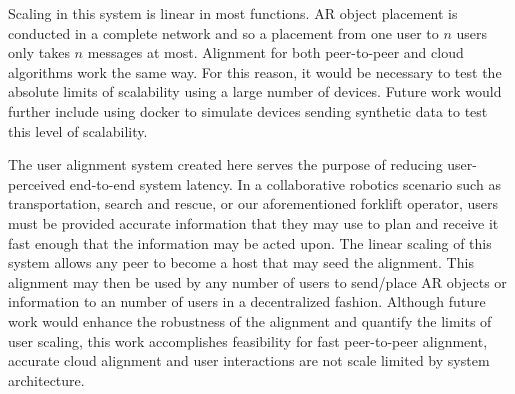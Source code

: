 \documentclass{vgtc}                          %
\begin{document}
Scaling in this system is linear in most functions. AR object placement is conducted in a complete network and so a placement 
from one user to $n$ users only takes $n$ messages at most. Alignment for both peer-to-peer and cloud algorithms work the same way.
For this reason, it would be necessary to test the absolute limits of scalability using a large number of devices. Future work
would further include using docker to simulate devices sending synthetic data to test this level of scalability.

The user alignment system created here serves the purpose of reducing user-perceived end-to-end system latency. In a 
collaborative robotics scenario such as transportation, search and rescue, or our aforementioned forklift operator, 
users must be provided accurate information that they may use to plan and receive it fast enough that the information may be acted upon.
The linear scaling of this system allows any peer to become a host that may seed the alignment. This alignment may then be 
used by any number of users to send/place AR objects or information to an number of users in a decentralized fashion.
Although future work would enhance the robustness of the alignment and quantify the limits of user scaling, this work 
accomplishes feasibility for fast peer-to-peer alignment, accurate cloud alignment and user interactions are not scale limited
by system architecture.


\clearpage


%

%
%
%


\end{document}
